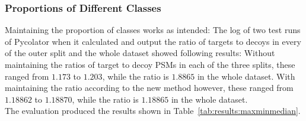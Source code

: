 \subsubsection{Proportions of Different Classes}
\label{lab:results:proportions}
Maintaining the proportion of classes works as intended: The log of two test runs of Pycolator when it calculated and output the ratio of targets to decoys in every of the outer split and the whole dataset showed following results: Without maintaining the ratios of target to decoy PSMs in each of the three splits, these ranged from $1.173$ to $1.203$, while the ratio is $1.8865$ in the whole dataset. With maintaining the ratio according to the new method however, these ranged from $1.18862$ to $1.18870$, while the ratio is $1.18865$ in the whole dataset.\\
The evaluation produced the results shown in
Table~\ref{tab:results:maxminmedian}.
\renewcommand{\baselinestretch}{0.9}
